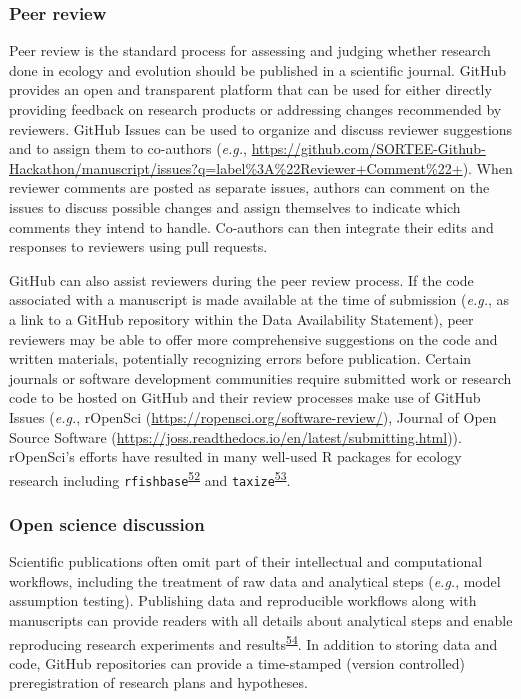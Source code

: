 \hypertarget{peer-review}{%
\subsubsection{Peer review}\label{peer-review}}

Peer review is the standard process for assessing and judging whether research done in ecology and evolution should be published in a scientific journal.
GitHub provides an open and transparent platform that can be used for either directly providing feedback on research products or addressing changes recommended by reviewers.
GitHub Issues can be used to organize and discuss reviewer suggestions and to assign them to co-authors (\emph{e.g.}, \url{https://github.com/SORTEE-Github-Hackathon/manuscript/issues?q=label\%3A\%22Reviewer+Comment\%22+}).
When reviewer comments are posted as separate issues, authors can comment on the issues to discuss possible changes and assign themselves to indicate which comments they intend to handle.
Co-authors can then integrate their edits and responses to reviewers using pull requests.

GitHub can also assist reviewers during the peer review process.
If the code associated with a manuscript is made available at the time of submission (\emph{e.g.}, as a link to a GitHub repository within the Data Availability Statement), peer reviewers may be able to offer more comprehensive suggestions on the code and written materials, potentially recognizing errors before publication.
Certain journals or software development communities require submitted work or research code to be hosted on GitHub and their review processes make use of GitHub Issues (\emph{e.g.}, rOpenSci (\url{https://ropensci.org/software-review/}), Journal of Open Source Software (\url{https://joss.readthedocs.io/en/latest/submitting.html})).
rOpenSci's efforts have resulted in many well-used R packages for ecology research including \texttt{rfishbase}\textsuperscript{\protect\hyperlink{ref-Xsdcv6q}{52}} and \texttt{taxize}\textsuperscript{\protect\hyperlink{ref-FVBWKkZu}{53}}.

\hypertarget{open-science-discussion}{%
\subsubsection{Open science discussion}\label{open-science-discussion}}

Scientific publications often omit part of their intellectual and computational workflows, including the treatment of raw data and analytical steps (\emph{e.g.}, model assumption testing).
Publishing data and reproducible workflows along with manuscripts can provide readers with all details about analytical steps and enable reproducing research experiments and results\textsuperscript{\protect\hyperlink{ref-NOgBWVAr}{54}}.
In addition to storing data and code, GitHub repositories can provide a time-stamped (version controlled) preregistration of research plans and hypotheses.

